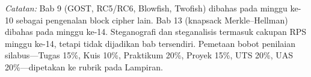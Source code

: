 \documentclass[../main.tex]{subfiles}
\begin{document}
\textit{Catatan:} Bab 9 (GOST, RC5/RC6, Blowfish, Twofish) dibahas pada minggu
ke-10 sebagai pengenalan block cipher lain. Bab 13 (knapsack Merkle--Hellman)
dibahas pada minggu ke-14. Steganografi dan steganalisis termasuk cakupan RPS
minggu ke-14, tetapi tidak dijadikan bab tersendiri. Pemetaan bobot penilaian
silabus---Tugas 15\%, Kuis 10\%, Praktikum 20\%, Proyek 15\%, UTS 20\%,
UAS 20\%---dipetakan ke rubrik pada Lampiran.
\end{document}
